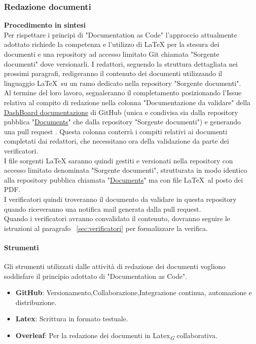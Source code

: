 \documentclass{article}
\begin{document}
\subsubsection{Redazione documenti}
\textbf{Procedimento in sintesi}\\
    Per rispettare i principi  di "Documentation as Code" l'approccio attualmente adottato richiede la competenza e l'utilizzo di LaTeX per la stesura dei documenti e una repository ad accesso limitato Git chiamata "Sorgente documenti" dove versionarli. I redattori, seguendo la struttura dettagliata nei prossimi paragrafi, redigeranno il contenuto dei documenti utilizzando il linguaggio \LaTeX\ su un ramo dedicato nella repository "Sorgente documenti". \\
    Al termine del loro lavoro, segnaleranno il completamento posizionando l'Issue relativa al compito di redazione nella colonna "Documentazione da validare" della \href{https://github.com/orgs/ByteOps-swe/projects/1/views/1}{DashBoard documentazione} di GitHub (unica e condivisa sia dalla repository pubblica "\href{https://github.com/ByteOps-swe/Documents}{Documents}" che dalla repository "Sorgente documenti") e generando una pull request . Questa colonna conterrà i compiti relativi ai documenti completati dai redattori, che necessitano ora della validazione da parte dei verificatori. \\
   
    I file sorgenti LaTeX saranno quindi gestiti e versionati nella repository con accesso limitato denominata "Sorgente documenti", strutturata in modo identico alla repository pubblica chiamata "\href{https://github.com/ByteOps-swe/Documents}{Documents}" ma con file \LaTeX\ al posto dei PDF. \\
    I verificatori quindi troveranno il documento da validare in questa repository quando riceveranno una notifica mail generata dalla pull request.\\
   Quando i verificatori avranno convalidato il contenuto, dovranno seguire le istruzioni al paragrafo ~\ref{sec:verificatori} per formalizzare la verifica.
    
\paragraph{Strumenti}
    Gli strumenti utilizzati dalle attività di redazione dei documenti vogliono soddisfare il principio adottato di "Documentation as Code".
    \begin{itemize}
        \item \textbf{GitHub}: Versionamento,Collaborazione,Integrazione continua, automazione e distribuzione.
        \item \textbf{Latex}: Scrittura in formato testuale.
        \item \textbf{Overleaf}: Per la redazione dei documenti in Latex\textsubscript{\textit{G}} collaborativa.
    \end{itemize}
\end{document}
